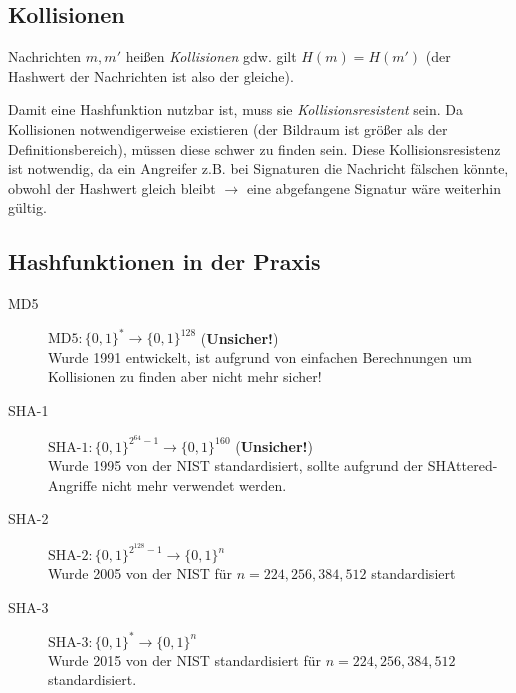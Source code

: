         \subsection{Kollisionen}
            Nachrichten \(m, m'\) heißen \textit{Kollisionen} gdw. gilt \( H(m) = H(m') \) (der Hashwert der Nachrichten ist also der gleiche).
            
            Damit eine Hashfunktion nutzbar ist, muss sie \textit{Kollisionsresistent} sein. Da Kollisionen notwendigerweise existieren (der Bildraum ist größer als der Definitionsbereich), müssen diese schwer zu finden sein. Diese Kollisionsresistenz ist notwendig, da ein Angreifer z.B. bei Signaturen die Nachricht fälschen könnte, obwohl der Hashwert gleich bleibt \(\rightarrow\) eine  abgefangene Signatur wäre weiterhin gültig.
        
        \subsection{Hashfunktionen in der Praxis}
            \begin{description}
            	\item[MD5] \( \text{MD5} : \{0,1\}^* \rightarrow \{0,1\}^{128} \) \hfill(\textbf{Unsicher!}) \\ Wurde 1991 entwickelt, ist aufgrund von einfachen Berechnungen um Kollisionen zu finden aber nicht mehr sicher!
            	\item[SHA-1] \( \text{SHA-1} : \{0,1\}^{2^{64}-1} \rightarrow \{0,1\}^{160} \) \hfill(\textbf{Unsicher!}) \\ Wurde 1995 von der NIST standardisiert, sollte aufgrund der SHAttered-Angriffe nicht mehr verwendet werden.
            	\item[SHA-2] \( \text{SHA-2} : \{0,1\}^{2^{128}-1} \rightarrow \{0,1\}^{n} \) \\ Wurde 2005 von der NIST für \( n = 224, 256, 384, 512 \) standardisiert
            	\item[SHA-3] \( \text{SHA-3} : \{0,1\}^* \rightarrow \{0,1\}^{n} \) \\ Wurde 2015 von der NIST standardisiert für \( n = 224, 256, 384, 512 \) standardisiert.
            \end{description}
    
